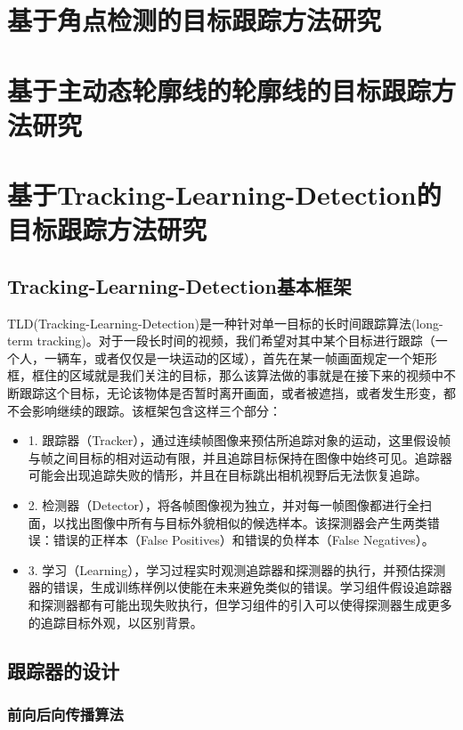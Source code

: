 \section{基于角点检测的目标跟踪方法研究}





\section{基于主动态轮廓线的轮廓线的目标跟踪方法研究}






\section{基于Tracking-Learning-Detection的目标跟踪方法研究}
\subsection{Tracking-Learning-Detection基本框架}
TLD(Tracking-Learning-Detection)是一种针对单一目标的长时间跟踪算法(long-term tracking)。对于一段长时间的视频，我们希望对其中某个目标进行跟踪（一个人，一辆车，或者仅仅是一块运动的区域），首先在某一帧画面规定一个矩形框，框住的区域就是我们关注的目标，那么该算法做的事就是在接下来的视频中不断跟踪这个目标，无论该物体是否暂时离开画面，或者被遮挡，或者发生形变，都不会影响继续的跟踪。该框架包含这样三个部分：
\begin{itemize}
	\item 1. 跟踪器（Tracker），通过连续帧图像来预估所追踪对象的运动，这里假设帧与帧之间目标的相对运动有限，并且追踪目标保持在图像中始终可见。追踪器可能会出现追踪失败的情形，并且在目标跳出相机视野后无法恢复追踪。
	\item 2. 检测器（Detector），将各帧图像视为独立，并对每一帧图像都进行全扫面，以找出图像中所有与目标外貌相似的候选样本。该探测器会产生两类错误：错误的正样本（False Positives）和错误的负样本（False Negatives）。
	\item 3. 学习（Learning），学习过程实时观测追踪器和探测器的执行，并预估探测器的错误，生成训练样例以使能在未来避免类似的错误。学习组件假设追踪器和探测器都有可能出现失败执行，但学习组件的引入可以使得探测器生成更多的追踪目标外观，以区别背景。
\end{itemize}
\subsection{跟踪器的设计}
\subsubsection{前向后向传播算法}

